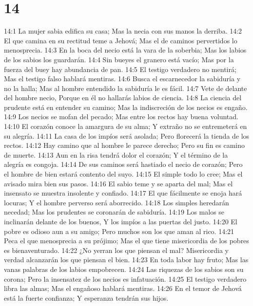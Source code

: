 \chapter{14}


14:1 La mujer sabia edifica su casa;  
Mas la necia con sus manos la derriba.  
14:2 El que camina en su rectitud teme a Jehová;  
Mas el de caminos pervertidos lo menosprecia.  
14:3 En la boca del necio está la vara de la soberbia;  
Mas los labios de los sabios los guardarán.  
14:4 Sin bueyes el granero está vacío;  
Mas por la fuerza del buey hay abundancia de pan.  
14:5 El testigo verdadero no mentirá;  
Mas el testigo falso hablará mentiras.  
14:6 Busca el escarnecedor la sabiduría y no la halla;  
Mas al hombre entendido la sabiduría le es fácil.  
14:7 Vete de delante del hombre necio,  
Porque en él no hallarás labios de ciencia.  
14:8 La ciencia del prudente está en entender su camino;  
Mas la indiscreción de los necios es engaño.  
14:9 Los necios se mofan del pecado;  
Mas entre los rectos hay buena voluntad.  
14:10 El corazón conoce la amargura de su alma;  
Y extraño no se entremeterá en su alegría.  
14:11 La casa de los impíos será asolada;  
Pero florecerá la tienda de los rectos.  
14:12 Hay camino que al hombre le parece derecho;  
Pero su fin es camino de muerte. 
14:13 Aun en la risa tendrá dolor el corazón;  
Y el término de la alegría es congoja.  
14:14 De sus caminos será hastiado el necio de corazón;  
Pero el hombre de bien estará contento del suyo.  
14:15 El simple todo lo cree;  
Mas el avisado mira bien sus pasos.  
14:16 El sabio teme y se aparta del mal;  
Mas el insensato se muestra insolente y confiado.  
14:17 El que fácilmente se enoja hará locuras;  
Y el hombre perverso será aborrecido.  
14:18 Los simples heredarán necedad;  
Mas los prudentes se coronarán de sabiduría.  
14:19 Los malos se inclinarán delante de los buenos,  
Y los impíos a las puertas del justo.  
14:20 El pobre es odioso aun a su amigo;  
Pero muchos son los que aman al rico.  
14:21 Peca el que menosprecia a su prójimo;  
Mas el que tiene misericordia de los pobres es bienaventurado.  
14:22 ¿No yerran los que piensan el mal?  
Misericordia y verdad alcanzarán los que piensan el bien.  
14:23 En toda labor hay fruto;  
Mas las vanas palabras de los labios empobrecen.  
14:24 Las riquezas de los sabios son su corona;  
Pero la insensatez de los necios es infatuación.  
14:25 El testigo verdadero libra las almas;  
Mas el engañoso hablará mentiras.  
14:26 En el temor de Jehová está la fuerte confianza;  
Y esperanza tendrán sus hijos.  
